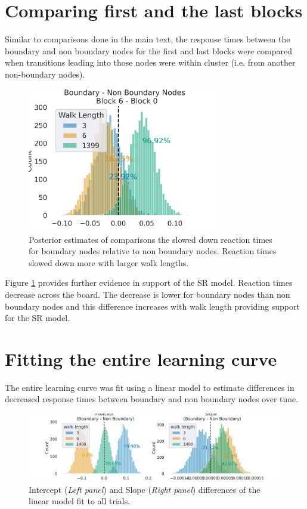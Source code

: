 \section{Comparing first and the last blocks}

Similar to comparisons done in the main text, the response times between the boundary and non boundary nodes for the first and last blocks were compared when transitions leading into those nodes were within cluster (i.e. from another non-boundary nodes).

\begin{figure}[H]
    \centering
    \includegraphics[width = 0.75\textwidth]{chapter_notebooks/chapter_2/figures/nb_b_diff_block60.png}
    \caption{Posterior estimates of comparisons the slowed down reaction times for boundary nodes relative to non boundary nodes. Reaction times slowed down more with larger walk lengths.}
    \label{fig:bayesmodel-firstlastblocks}
\end{figure}

Figure \ref{fig:bayesmodel-firstlastblocks} provides further evidence in support of the SR model. Reaction times decrease across the board. The decrease is lower for boundary nodes than non boundary nodes and this difference increases with walk length providing support for the SR model. 

\section{Fitting the entire learning curve}
The entire learning curve was fit using a linear model to estimate differences in decreased response times between boundary and non boundary nodes over time. 

\begin{figure}[H]
    \centering
    \includegraphics[width = \textwidth]{chapter_notebooks/chapter_2/figures/allblocks_lrmodel_trial_ppt_lag.png}
    \caption{Intercept (\textit{Left panel}) and Slope (\textit{Right panel}) differences of the linear model fit to all trials.}
    \label{fig:alltrial-lrmodel}
\end{figure}

